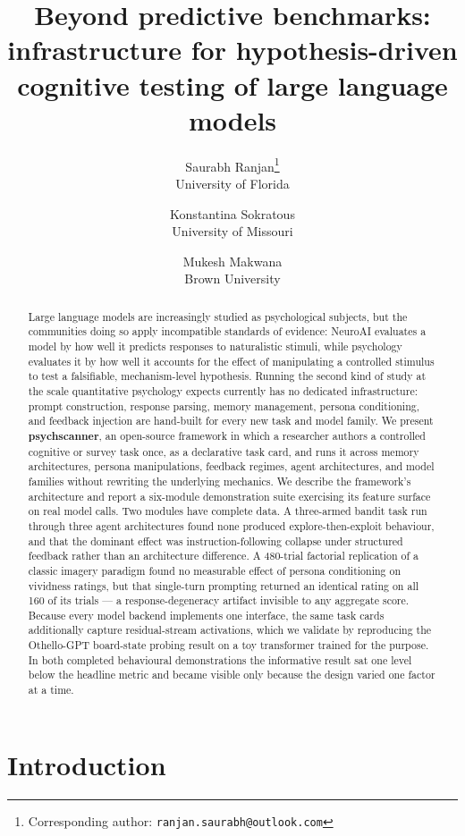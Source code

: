 \documentclass[11pt]{article}
\title{Beyond predictive benchmarks: infrastructure for hypothesis-driven cognitive testing of large language models}
\author{%
  Saurabh Ranjan\thanks{Corresponding author: \texttt{ranjan.saurabh@outlook.com}} \\ \small University of Florida
  \and
  Konstantina Sokratous \\ \small University of Missouri
  \and
  Mukesh Makwana \\ \small Brown University
}
\date{}
\begin{document}
\maketitle

\begin{abstract}
Large language models are increasingly studied as psychological subjects,
but the communities doing so apply incompatible standards of evidence:
NeuroAI evaluates a model by how well it predicts responses to naturalistic
stimuli, while psychology evaluates it by how well it accounts for the
effect of manipulating a controlled stimulus to test a falsifiable,
mechanism-level hypothesis. Running the second kind of study at the scale
quantitative psychology expects currently has no dedicated infrastructure:
prompt construction, response parsing, memory management, persona
conditioning, and feedback injection are hand-built for every new task and
model family. We present \textbf{psychscanner}, an open-source framework in
which a researcher authors a controlled cognitive or survey task once, as a
declarative task card, and runs it across memory architectures, persona
manipulations, feedback regimes, agent architectures, and model families
without rewriting the underlying mechanics. We describe the framework's
architecture and report a six-module demonstration suite exercising its
feature surface on real model calls. Two modules have complete data. A
three-armed bandit task run through three agent architectures found none
produced explore-then-exploit behaviour, and that the dominant effect was
instruction-following collapse under structured feedback rather than an
architecture difference. A 480-trial factorial replication of a classic
imagery paradigm found no measurable effect of persona conditioning on
vividness ratings, but that single-turn prompting returned an identical
rating on all 160 of its trials --- a response-degeneracy artifact
invisible to any aggregate score. Because every model backend implements
one interface, the same task cards additionally capture residual-stream
activations, which we validate by reproducing the Othello-GPT board-state
probing result on a toy transformer trained for the purpose. In both
completed behavioural demonstrations the informative result sat one level
below the headline metric and became visible only because the design varied
one factor at a time.
\end{abstract}

\section{Introduction}
\end{document}
